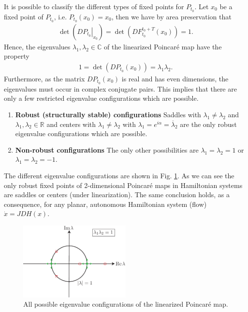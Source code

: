 It is possible to classify the different types of fixed points for $P_{t_0}$. Let $x_0$ be a fixed point of $P_{t_0}$, i.e. $P_{t_0}(x_0) = x_0$, then we have by area preservation that
\begin{align}
	\det\left( \left.DP_{t_0}\right|_{x_0}\right) = \det\left( DF_{t_0}^{t_0 + T}(x_0) \right) = 1.
\end{align}
Hence, the eigenvalues $\lambda_1, \lambda_2\in \mathbb{C}$ of the linearized Poincaré map have the property 
\begin{align}
	1 = \det\left(DP_{t_0}(x_0)\right) = \lambda_1 \lambda_2.
\end{align}
Furthermore, as the matrix $D P_{t_0}(x_0)$ is real and has even dimensions, the eigenvalues must occur in complex conjugate pairs.
This implies that there are only a few restricted eigenvalue configurations which are possible.
\begin{enumerate}
	\item \textbf{Robust (structurally stable) configurations} Saddles with $\lambda_1 \neq \lambda_2$ and $\lambda_1, \lambda_2 \in \mathbb{R}$ and centers with $\lambda_1 \neq \lambda_2$ with $\lambda_1 = e^{i \alpha } = \overline{\lambda }_2$ are the only robust eigenvalue configurations which are possible.
	\item \textbf{Non-robust configurations} The only other possibilities are $\lambda _1=\lambda _2 = 1$ or $\lambda _1 = \lambda _2 = -1$. 
\end{enumerate}
The different eigenvalue configurations are shown in Fig. \ref{fig:poinc_eigv_config}. As we can see the only robust fixed points of 2-dimensional Poincaré maps in Hamiltonian systems are saddles or centers (under linearization). The same conclusion holds, as a consequence, for any planar, autonomous Hamiltonian system (flow) $\dot{x} = JDH(x)$.
\begin{figure}[h!]
	\centering
	\includegraphics[width=0.5\textwidth]{figures/ch8/7poinc_eigv_config.pdf}
	\caption{All possible eigenvalue configurations of the linearized Poincaré map.}
	\label{fig:poinc_eigv_config}
\end{figure}

